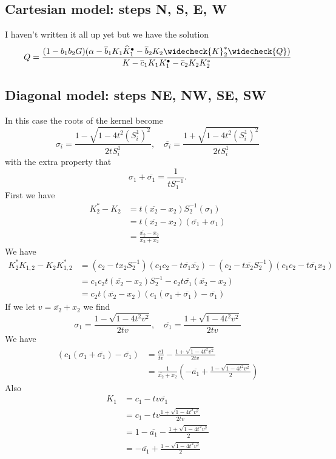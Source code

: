 \documentclass[12pt]{article}
\theoremstyle{definition} \newtheorem{definition}[theorem]{Definition}
\newcommand{\ol}[1]{\overline{#1}}
\newcommand{\wh}{\widehat}
\newcommand{\wc}{\widecheck}
\begin{document}
\subsection{Cartesian model: steps N, S, E, W}
I haven't written it all up yet but we have the solution
\[
	Q = \frac{(1-b_1b_2 G)(\alpha - \ol{b}_1 K_1 \wh{K}_1^\bullet -\ol{b}_2K_2\wc{K}_2^\ast \wc{Q})}{K - \ol{c}_1 K_1 K_1^\bullet - \ol{c}_2 K_2 K_2^\ast}
\]
\subsection{Diagonal model: steps NE, NW, SE, SW}
In this case the roots of the kernel become
\[
    \sigma_i = \frac{1-\sqrt{1-4t^2 (S_i^1)^2}}{2tS_i^1},\quad\ol{\sigma_i} = \frac{1+\sqrt{1-4t^2 (S_i^1)^2}}{2tS_i^1}
\]
with the extra property that
\[
   \sigma_1+\ol{\sigma_1} = \frac{1}{tS_1^{-1}}.
\]
First we have
\begin{align*}
K_2^\ast - K_2 
&= t(\ol{x_2}-x_2)S_2^{-1}(\sigma_1)\\
&=t(\ol{x_2}-x_2)(\ol{\sigma_1}+\sigma_1)\\
&=\frac{\ol{x_2}-x_2}{\ol{x_2}+x_2}
\end{align*}
We have
\begin{align*}
K_2^\ast K_{1,2} - K_2 K_{1,2}^\ast &= (c_2-tx_2S_2^{-1})\left(c_1c_2 - t\ol{\sigma_1}\ol{x_2}\right)-(c_2-t\ol{x_2}S_2^{-1})\left(c_1c_2 - t\ol{\sigma_1}x_2\right)\\
&=c_1c_2t(\ol{x_2}-x_2)S_2^{-1} - c_2t\ol{\sigma_1}(\ol{x_2}-x_2)\\
&=c_2t(\ol{x_2}-x_2)(c_1(\sigma_1+\ol{\sigma_1})-\ol{\sigma_1})
\end{align*}
If we let $v = \ol{x_2}+x_2$ we find
\[
  \sigma_1 = \frac{1-\sqrt{1-4t^2v^2}}{2tv},\quad \ol{\sigma_1} = \frac{1+\sqrt{1-4t^2v^2}}{2tv}
\]
We have
\begin{align*}
(c_1(\sigma_1+\ol{\sigma_1})-\ol{\sigma_1})&= \frac{c1}{tv}-\frac{1+\sqrt{1-4t^2v^2}}{2tv}\\
&=\frac{1}{\ol{x_2}+x_2}\left(-\ol{a_1}+\frac{1-\sqrt{1-4t^2v^2}}{2}\right)
\end{align*}
Also
\begin{align*}
K_1 &= c_1-tv\ol{\sigma_1} \\
&= c_1-tv\frac{1+\sqrt{1-4t^2v^2}}{2tv}\\
&=1-\ol{a_1}-\frac{1+\sqrt{1-4t^2v^2}}{2}\\
&=-\ol{a_1}+\frac{1-\sqrt{1-4t^2v^2}}{2}
\end{align*}
\end{document}
